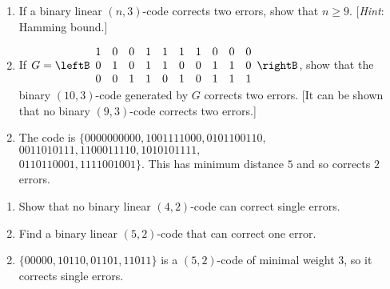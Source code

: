 \begin{multicols}{2}
\begin{ex}
\begin{sol}
\begin{enumerate}[label={\alph*.}]
\end{enumerate}
\end{sol}
\end{ex}


\begin{ex}
\begin{enumerate}[label={\alph*.}]
\item If a binary linear $(n, 3)$-code corrects two errors, show that $n \geq 9$. [\textit{Hint}: Hamming bound.]

\item If $G = \leftB \begin{array}{rrrrrrrrrr}
1 & 0 & 0 & 1 & 1 & 1 & 1 & 0 & 0 & 0 \\
0 & 1 & 0 & 1 & 1 & 0 & 0 & 1 & 1 & 0 \\
0 & 0 & 1 & 1 & 0 & 1 & 0 & 1 & 1 & 1
\end{array}\rightB$, show that the binary $(10, 3)$-code generated by $G$ corrects two errors. [It can be shown that no binary $(9, 3)$-code corrects two errors.]

\end{enumerate}
\begin{sol}
\begin{enumerate}[label={\alph*.}]
\setcounter{enumi}{1}
\item  The code is $\{0000000000, 1001111000, 0101100110,$ \\ $ 0011010111, 1100011110, 1010101111,$ \\ $ 0110110001, 1111001001\}$. This has minimum distance $5$ and so corrects $2$ errors.

\end{enumerate}
\end{sol}
\end{ex}

\begin{ex}
\begin{enumerate}[label={\alph*.}]
\item Show that no binary linear $(4, 2)$-code can correct single errors.

\item Find a binary linear $(5, 2)$-code that can correct one error.

\end{enumerate}
\begin{sol}
\begin{enumerate}[label={\alph*.}]
\setcounter{enumi}{1}
\item  $\{00000, 10110, 01101, 11011\}$ is a $(5, 2)$-code of minimal weight $3$, so it corrects single errors.


\end{enumerate}
\end{sol}
\end{ex}
\end{multicols}
